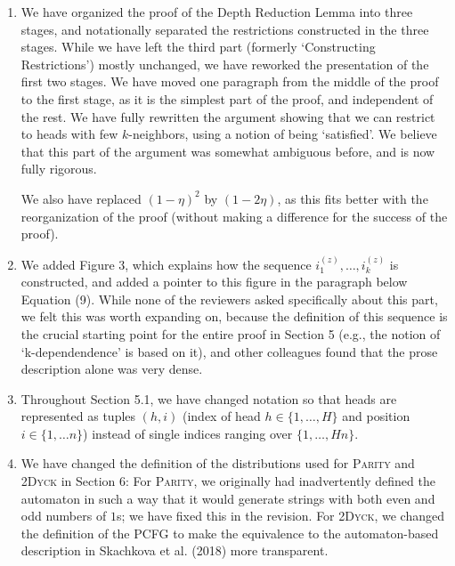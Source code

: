 \documentclass[11pt,a4paper]{article}
\newcommand\response[1]{{\color{blue}#1}}
\begin{document}
\begin{enumerate}
\item \response{We have organized the proof of the Depth Reduction Lemma into three stages, and notationally separated the restrictions constructed in the three stages. While we have left the third part (formerly `Constructing Restrictions') mostly unchanged, we have reworked the presentation of the first two stages. We have moved one paragraph from the middle of the proof to the first stage, as it is the simplest part of the proof, and independent of the rest. We have fully rewritten the argument showing that we can restrict to heads with few $k$-neighbors, using a notion of being `satisfied'. We believe that this part of the argument was somewhat ambiguous before, and is now fully rigorous.}

\response{We also have replaced $(1-\eta)^2$ by $(1-2\eta)$, as this fits better with the reorganization of the proof (without making a difference for the success of the proof).}

\item \response{We added Figure 3, which explains how the sequence $i^{(z)}_1, \dots, i^{(z)}_k$ is constructed, and added a pointer to this figure in the paragraph below Equation (9). While none of the reviewers asked specifically about this part, we felt this was worth expanding on, because the definition of this sequence is the crucial starting point for the entire proof in Section 5 (e.g., the notion of `k-dependendence' is based on it), and other colleagues found that the prose description alone was very dense.}

\item \response{Throughout Section 5.1, we have changed notation so that heads are represented as tuples $(h,i)$ (index of head $h \in \{1,\dots, H\}$ and position $i \in \{1, \dots n\}$) instead of single indices ranging over $\{1, \dots, Hn\}$.}

\item \response{We have changed the definition of the distributions used for \textsc{Parity} and \textsc{2Dyck} in Section 6: For \textsc{Parity}, we originally had inadvertently defined the automaton in such a way that it would generate strings with both even and odd numbers of $1$s; we have fixed this in the revision. For \textsc{2Dyck}, we changed the definition of the PCFG to make the equivalence to the automaton-based description in Skachkova et al. (2018) more transparent.}


\end{enumerate}
\end{document}

